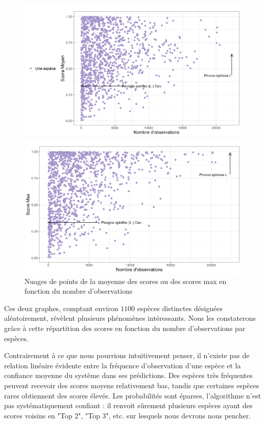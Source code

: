 \documentclass[a4paper,12pt]{article}
\begin{document}
\begin{figure}[H]
\centering
\begin{minipage}{0.5\textwidth}
  \includegraphics[width=0.9\linewidth]{images/mean_rd.png}
\end{minipage}%
\begin{minipage}{0.5\textwidth}
  \includegraphics[width=0.9\linewidth]{images/max_rd.png}
\end{minipage}
\caption{Nuages de points de la moyenne des scores ou des scores max en fonction du nombre d'observations}
\end{figure}

Ces deux graphes, comptant environ $\num{1100}$ espèces distinctes désignées aléatoirement, révèlent plusieurs phénomènes intéressants. Nous les constaterons grâce à cette répartition des scores en fonction du nombre d'observations par espèces.

\vspace{0.2cm}

Contrairement à ce que nous pourrions intuitivement penser, il n'existe pas de relation linéaire évidente entre la fréquence d'observation d'une espèce et la confiance moyenne du système dans ses prédictions. Des espèces très fréquentes peuvent recevoir des scores moyens relativement bas, tandis que certaines espèces rares obtiennent des scores élevés. Les probabilités sont éparses, l'algorithme n'est pas systématiquement confiant : il renvoit sûrement plusieurs espèces ayant des scores voisins en "Top 2", "Top 3", etc. sur lesquels nous devrons nous pencher.
\end{document}
